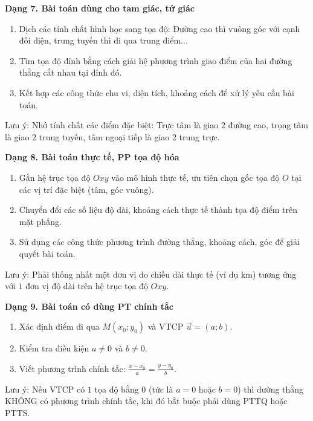 \textbf{Dạng 7. Bài toán dùng cho tam giác, tứ giác}
\begin{enumerate}
\item Dịch các tính chất hình học sang tọa độ: Đường cao thì vuông góc với cạnh đối diện, trung tuyến thì đi qua trung điểm...
\item Tìm tọa độ đỉnh bằng cách giải hệ phương trình giao điểm của hai đường thẳng cắt nhau tại đỉnh đó.
\item Kết hợp các công thức chu vi, diện tích, khoảng cách để xử lý yêu cầu bài toán.
\end{enumerate}
Lưu ý: Nhớ tính chất các điểm đặc biệt: Trực tâm là giao $2$ đường cao, trọng tâm là giao $2$ trung tuyến, tâm ngoại tiếp là giao $2$ trung trực.

\textbf{Dạng 8. Bài toán thực tế, PP tọa độ hóa}
\begin{enumerate}
\item Gắn hệ trục tọa độ $Oxy$ vào mô hình thực tế, ưu tiên chọn gốc tọa độ $O$ tại các vị trí đặc biệt (tâm, góc vuông).
\item Chuyển đổi các số liệu độ dài, khoảng cách thực tế thành tọa độ điểm trên mặt phẳng.
\item Sử dụng các công thức phương trình đường thẳng, khoảng cách, góc để giải quyết bài toán.
\end{enumerate}
Lưu ý: Phải thống nhất một đơn vị đo chiều dài thực tế (ví dụ km) tương ứng với $1$ đơn vị độ dài trên hệ trục tọa độ $Oxy$.

\textbf{Dạng 9. Bài toán có dùng PT chính tắc}
\begin{enumerate}
\item Xác định điểm đi qua $M(x_0; y_0)$ và VTCP $\overrightarrow{u}=(a; b)$.
\item Kiểm tra điều kiện $a \neq 0$ và $b \neq 0$.
\item Viết phương trình chính tắc: $\frac{x-x_0}{a} = \frac{y-y_0}{b}$.
\end{enumerate}
Lưu ý: Nếu VTCP có $1$ tọa độ bằng $0$ (tức là $a=0$ hoặc $b=0$) thì đường thẳng KHÔNG có phương trình chính tắc, khi đó bắt buộc phải dùng PTTQ hoặc PTTS.
